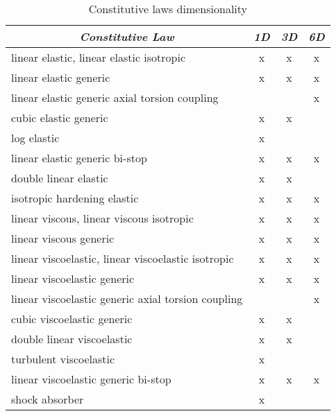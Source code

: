 \begin{table}[h]
    \newlength{\constlawwidth}
    \setlength{\constlawwidth}{70mm}
    \centering
    \caption{Constitutive laws dimensionality}\label{tab:CONST-LAW-DIM}
    \begin{tabular}{l|c|c|c} 
        \hline
        \multicolumn{1}{c}{\textbf{\emph{Constitutive Law}}} &
	\multicolumn{1}{c}{\textbf{\emph{1D}}} &
	\multicolumn{1}{c}{\textbf{\emph{3D}}} &
	\multicolumn{1}{c}{\textbf{\emph{6D}}} \\ 
	\hline
	linear elastic, linear elastic isotropic               & x & x & x \\
	linear elastic generic                                 & x & x & x \\
	linear elastic generic axial torsion coupling          &   &   & x \\
	cubic elastic generic                                  & x & x &   \\
	log elastic                                            & x &   &   \\
	linear elastic generic bi-stop                         & x & x & x \\
	double linear elastic                                  & x & x &   \\
	isotropic hardening elastic                            & x & x & x \\
	linear viscous, linear viscous isotropic               & x & x & x \\
	linear viscous generic                                 & x & x & x \\
	linear viscoelastic, linear viscoelastic isotropic     & x & x & x \\
	linear viscoelastic generic                            & x & x & x \\
	linear viscoelastic generic axial torsion coupling     &   &   & x \\
	cubic viscoelastic generic                             & x & x &   \\
	double linear viscoelastic                             & x & x &   \\
	turbulent viscoelastic                                 & x &   &   \\
	linear viscoelastic generic bi-stop                    & x & x & x \\
	shock absorber                                         & x &   &   \\
	\hline
    \end{tabular}
\end{table}

